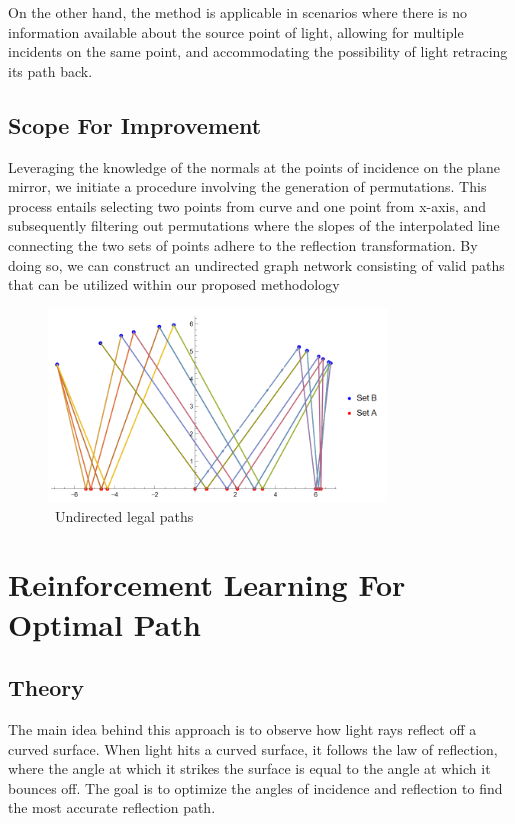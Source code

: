 \documentclass[12pt,a4paper,twoside]{report}
\begin{document}
On the other hand, the method is applicable in scenarios where there is no information available about the source point of light, allowing for multiple incidents on the same point, and accommodating the possibility of light retracing its path back.

\subsection{Scope For Improvement}
Leveraging the knowledge of the normals at the points of incidence on the plane mirror, we initiate a procedure involving the generation of permutations. This process entails selecting two points from curve and one point from x-axis, and subsequently filtering out permutations where the slopes of the interpolated line connecting the two sets of points adhere to the reflection transformation. By doing so, we can construct an undirected graph network consisting of valid paths that can be utilized within our proposed methodology

\begin{figure}[h]
	\centering
	\includegraphics[width=0.8\textwidth]{pic5}
	\caption{~Undirected legal paths}
\end{figure}

\newpage
\section{Reinforcement Learning For Optimal Path}
\subsection{Theory}

The main idea behind this approach is to observe how light rays reflect off a curved surface. When light hits a curved surface, it follows the law of reflection, where the angle at which it strikes the surface is equal to the angle at which it bounces off. The goal is to optimize the angles of incidence and reflection to find the most accurate reflection path. \\
\end{document}
